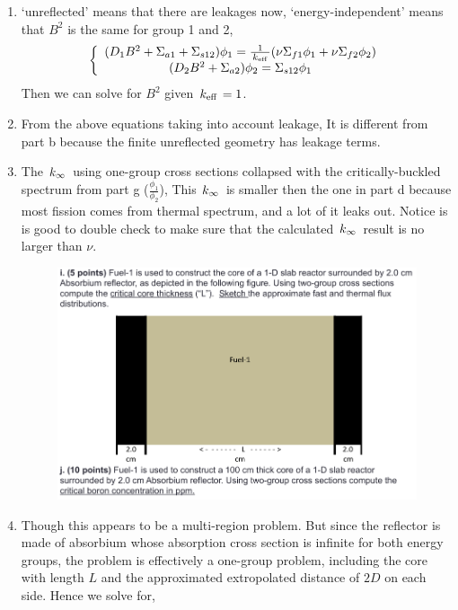 \documentclass{school-22.211-notes}
\begin{document}
\begin{enumerate}
\begin{enumerate}
\item `unreflected' means that there are leakages now, `energy-independent' means that $B^2$ is the same for group 1 and 2,
  \begin{align}
    \left\{ \begin{array}{c}
      (D_1 B^2 + \Sigma_{a1} + \Sigma_{s12} ) \phi_1 = \frac{1}{\left. k_{\mathrm{eff}} \right.} ( \nu \Sigma_{f1} \phi_1 + \nu \Sigma_{f2} \phi_2 )  \\
      (D_2 B^2 +  \Sigma_{a2}) \phi_2 = \Sigma_{s12} \phi_1 
    \end{array} \right. 
  \end{align}
Then we can solve for $B^2$ given $\left. k_{\mathrm{eff}} \right. = 1$. 

\item From the above equations taking into account leakage, 
  It is different from part b because the finite unreflected geometry has leakage terms. 

\item The $\left. k_{\infty} \right.$ using one-group cross sections collapsed with the critically-buckled spectrum from part g ($\frac{\phi_1}{\phi_2}$), 
  This $\left. k_{\infty} \right.$ is smaller then the one in part d because most fission comes from thermal spectrum, and a lot of it leaks out. Notice is is good to double check to make sure that the calculated $\left. k_{\infty} \right.$ result is no larger than $\nu$. 

\clearpage
\begin{figure}[ht]
  \centering
  \includegraphics[width=6in]{images/qual/quiz-3.png}
\end{figure}
\item Though this appears to be a multi-region problem. But since the reflector is made of absorbium whose absorption cross section is infinite for both energy groups, the problem is effectively a one-group problem, including the core with length $L$ and the approximated extropolated distance of $2D$ on each side. Hence we solve for, 


\end{enumerate}
\end{enumerate}
\end{document}
